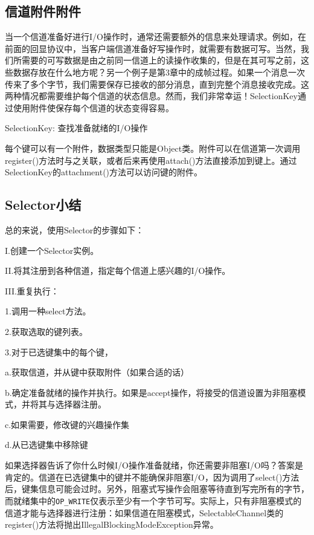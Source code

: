 	\subsection{信道附件附件}


		当一个信道准备好进行I/O操作时，通常还需要额外的信息来处理请求。例如，在前面的回显协议中，当客户端信道准备好写操作时，就需要有数据可写。当然，我们所需要的可写数据是由之前同一信道上的读操作收集的，但是在其可写之前，这些数据存放在什么地方呢？另一个例子是第3章中的成帧过程。如果一个消息一次传来了多个字节，我们需要保存已接收的部分消息，直到完整个消息接收完成。这两种情况都需要维护每个信道的状态信息。然而，我们非常幸运！SelectionKey通过使用附件使保存每个信道的状态变得容易。

		SelectionKey: 查找准备就绪的I/O操作

		

		每个键可以有一个附件，数据类型只能是Object类。附件可以在信道第一次调用register()方法时与之关联，或者后来再使用attach()方法直接添加到键上。通过SelectionKey的attachment()方法可以访问键的附件。 

	\subsection{Selector小结}

		总的来说，使用Selector的步骤如下：

		I.创建一个Selector实例。

		II.将其注册到各种信道，指定每个信道上感兴趣的I/O操作。

		III.重复执行：

		1.调用一种select方法。

		2.获取选取的键列表。

		3.对于已选键集中的每个键，

		a.获取信道，并从键中获取附件（如果合适的话）

		b.确定准备就绪的操作并执行。如果是accept操作，将接受的信道设置为非阻塞模式，并将其与选择器注册。

		c.如果需要，修改键的兴趣操作集

		d.从已选键集中移除键

		如果选择器告诉了你什么时候I/O操作准备就绪，你还需要非阻塞I/O吗？答案是肯定的。信道在已选键集中的键并不能确保非阻塞I/O，因为调用了select()方法后，键集信息可能会过时。另外，阻塞式写操作会阻塞等待直到写完所有的字节，而就绪集中的\verb|OP_WRITE|仅表示至少有一个字节可写。实际上，只有非阻塞模式的信道才能与选择器进行注册：如果信道在阻塞模式，SelectableChannel类的register()方法将抛出IllegalBlockingModeException异常。

